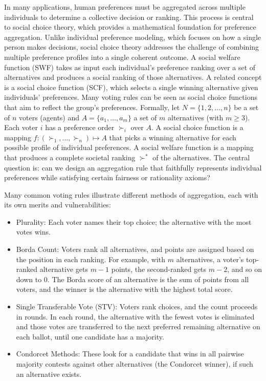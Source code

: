 \documentclass[
  letterpaper,
  numbers=noenddot,
  DIV=11]{scrreprt}
\providecommand{\tightlist}{%
  \setlength{\itemsep}{0pt}\setlength{\parskip}{0pt}}\usepackage{longtable,booktabs,array}
\theoremstyle{plain}
\theoremstyle{definition}
\theoremstyle{remark}
\begin{document}
In many applications, human preferences must be aggregated across
multiple individuals to determine a collective decision or ranking. This
process is central to social choice theory, which provides a
mathematical foundation for preference aggregation. Unlike individual
preference modeling, which focuses on how a single person makes
decisions, social choice theory addresses the challenge of combining
multiple preference profiles into a single coherent outcome. A social
welfare function (SWF) takes as input each individual's preference
ranking over a set of alternatives and produces a social ranking of
those alternatives. A related concept is a social choice function (SCF),
which selects a single winning alternative given individuals'
preferences. Many voting rules can be seen as social choice functions
that aim to reflect the group's preferences. Formally, let
\(N=\{1,2,\dots,n\}\) be a set of \(n\) voters (agents) and
\(A=\{a_1,\dots,a_m\}\) a set of \(m\) alternatives (with \(m \ge 3\)).
Each voter \(i\) has a preference order \(\succ_i\) over \(A\). A social
choice function is a mapping \(f: (\succ_1,\dots,\succ_n)\mapsto A\)
that picks a winning alternative for each possible profile of individual
preferences. A social welfare function is a mapping that produces a
complete societal ranking \(\succ^*\) of the alternatives. The central
question is: can we design an aggregation rule that faithfully
represents individual preferences while satisfying certain fairness or
rationality axioms?

Many common voting rules illustrate different methods of aggregation,
each with its own merits and vulnerabilities:

\begin{itemize}
\tightlist
\item
  Plurality: Each voter names their top choice; the alternative with the
  most votes wins.
\item
  Borda Count: Voters rank all alternatives, and points are assigned
  based on the position in each ranking. For example, with \(m\)
  alternatives, a voter's top-ranked alternative gets \(m-1\) points,
  the second-ranked gets \(m-2\), and so on down to 0. The Borda score
  of an alternative is the sum of points from all voters, and the winner
  is the alternative with the highest total score.
\item
  Single Transferable Vote (STV): Voters rank choices, and the count
  proceeds in rounds. In each round, the alternative with the fewest
  votes is eliminated and those votes are transferred to the next
  preferred remaining alternative on each ballot, until one candidate
  has a majority.
\item
  Condorcet Methods: These look for a candidate that wins in all
  pairwise majority contests against other alternatives (the Condorcet
  winner), if such an alternative exists.
\end{itemize}
\end{document}
